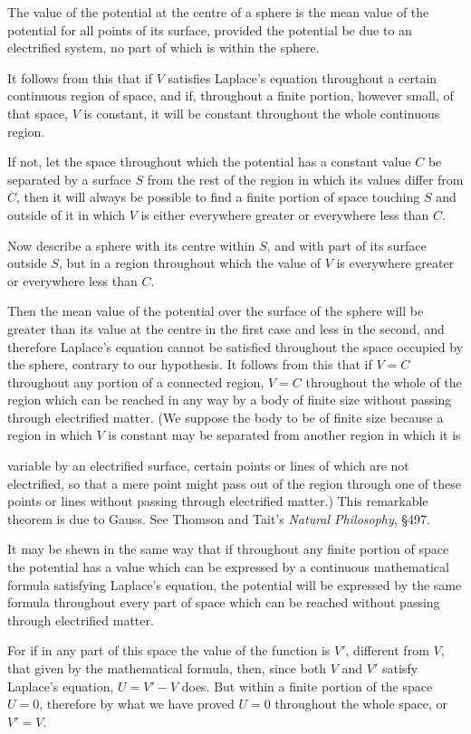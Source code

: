 \documentclass[11pt,a4paper]{article}
\begin{document}
The value of the potential at the centre of a sphere is the mean value of the potential for all points of its surface, provided the potential be due to an electrified system, no part of which is within the sphere.

It follows from this that if $V$ satisfies Laplace's equation throughout a certain continuous region of space, and if, throughout a finite portion, however small, of that space, $V$ is constant, it will be constant throughout the whole continuous region.

If not, let the space throughout which the potential has a constant value $C$ be separated by a surface $S$ from the rest of the region in which its values differ from $C$, then it will always be possible to find a finite portion of space touching $S$ and outside of it in which $V$ is either everywhere greater or everywhere less than $C$.

Now describe a sphere with its centre within $S$, and with part of its surface outside $S$, but in a region throughout which the value of $V$ is everywhere greater or everywhere less than $C$.

Then the mean value of the potential over the surface of the sphere will be greater than its value at the centre in the first case and less in the second, and therefore Laplace's equation cannot be satisfied throughout the space occupied by the sphere, contrary to our hypothesis. It follows from this that if $V=C$ throughout any portion of a connected region, $V=C$ throughout the whole of the region which can be reached in any way by a body of finite size without passing through electrified matter. (We suppose the body to be of finite size because a region in which $V$ is constant may be separated from another region in which it is

variable by an electrified surface, certain points or lines of which are not electrified, so that a mere point might pass out of the region through one of these points or lines without passing through electrified matter.) This remarkable theorem is due to Gauss. See Thomson and Tait's \emph{Natural Philosophy}, \S 497.

It may be shewn in the same way that if throughout any finite portion of space the potential has a value which can be expressed by a continuous mathematical formula satisfying Laplace's equation, the potential will be expressed by the same formula throughout every part of space which can be reached without passing through electrified matter.

For if in any part of this space the value of the function is $V'$, different from $V$, that given by the mathematical formula, then, since both $V$ and $V'$ satisfy Laplace's equation, $U=V'-V$ does. But within a finite portion of the space $U=0$, therefore by what we have proved $U=0$ throughout the whole space, or $V'=V$.
\end{document}
